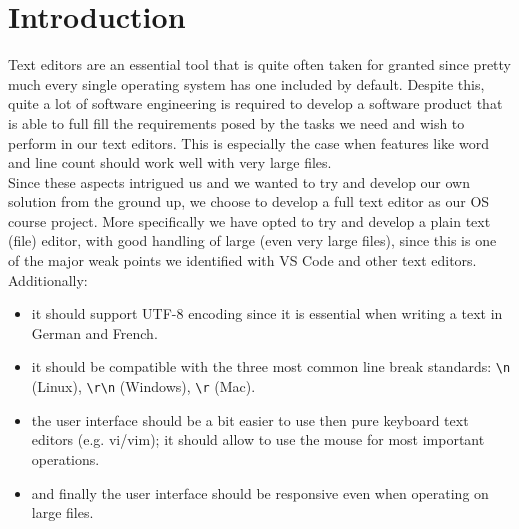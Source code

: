 \section{Introduction}\label{sec:intro}


Text editors are an essential tool that is quite often taken for granted since pretty much every single operating system has one included by default. Despite this, quite a lot of software engineering is required to develop a software product that is able to full fill the requirements posed by the tasks we need and wish to perform in our text editors. This is especially the case when features like word and line count should work well with very large files. \\
Since these aspects intrigued us and we wanted to try and develop our own solution from the ground up, we choose to develop a full text editor as our OS course project. More specifically we have opted to try and develop a plain text (file) editor, with good handling of large (even very large files), since this is one of the major weak points we identified with VS Code and other text editors. 
Additionally: 
\begin{itemize}
\item  it should support UTF-8 encoding since it is essential when writing a text in German and French.
\item it should be compatible with the three most common line break standards: \verb|\n| (Linux), \verb|\r\n| (Windows), \verb|\r| (Mac). 
\item the user interface should be a bit easier to use then pure keyboard text editors (e.g. vi/vim); it should allow to use the mouse for most important operations.
\item and finally the user interface should be responsive even when operating on large files.
\end{itemize}

